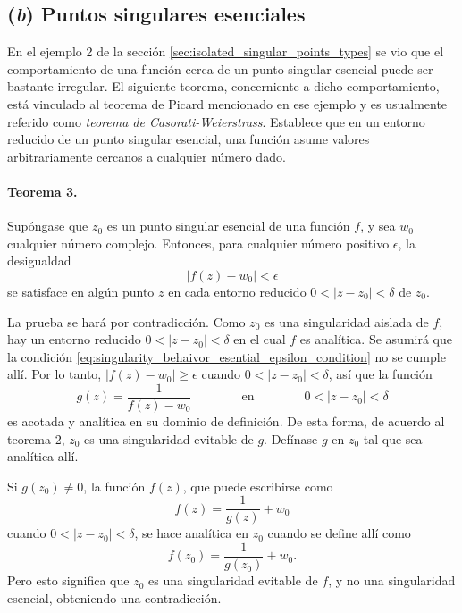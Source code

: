\documentclass[a4paper]{report}
\begin{document}
\subsection*{(\textit{b}) Puntos singulares esenciales}

En el ejemplo 2 de la sección \ref{sec:isolated_singular_points_types} se vio que el comportamiento de una función cerca de un punto singular esencial puede ser bastante irregular. El siguiente teorema, concerniente a dicho comportamiento, está vinculado al teorema de Picard mencionado en ese ejemplo y es usualmente referido como \emph{teorema de Casorati-Weierstrass}. Establece que en un entorno reducido de un punto singular esencial, una función asume valores arbitrariamente cercanos a cualquier número dado.

\paragraph{Teorema 3.} Supóngase que \(z_0\) es un punto singular esencial de una función \(f\), y sea \(w_0\) cualquier número complejo. Entonces, para cualquier número positivo \(\epsilon\), la desigualdad 
\begin{equation}\label{eq:singularity_behaivor_esential_epsilon_condition}
 |f(z)-w_0|<\epsilon 
\end{equation}
se satisface en algún punto \(z\) en cada entorno reducido \(0<|z-z_0|<\delta\) de \(z_0\).

La prueba se hará por contradicción. Como \(z_0\) es una singularidad aislada de \(f\), hay un entorno reducido \(0<|z-z_0|<\delta\) en el cual \(f\) es analítica. Se asumirá que la condición \ref{eq:singularity_behaivor_esential_epsilon_condition} no se cumple allí. Por lo tanto, \(|f(z)-w_0|\geq\epsilon\) cuando \(0<|z-z_0|<\delta\), así que la función
\[
 g(z)=\frac{1}{f(z)-w_0}
 \qquad\qquad\textrm{en}\qquad\qquad
 0<|z-z_0|<\delta
\]
es acotada y analítica en su dominio de definición. De esta forma, de acuerdo al teorema 2, \(z_0\) es una singularidad evitable de \(g\). Defínase \(g\) en \(z_0\) tal que sea analítica allí.

Si \(g(z_0)\neq0\), la función \(f(z)\), que puede escribirse como 
\begin{equation}\label{eq:singularity_behaivor_esential_f}
 f(z)=\frac{1}{g(z)}+w_0 
\end{equation}
cuando \(0<|z-z_0|<\delta\), se hace analítica en \(z_0\) cuando se define allí como
\[
 f(z_0)=\frac{1}{g(z_0)}+w_0.
\]
Pero esto significa que \(z_0\) es una singularidad evitable de \(f\), y no una singularidad esencial, obteniendo una contradicción.
\end{document}
